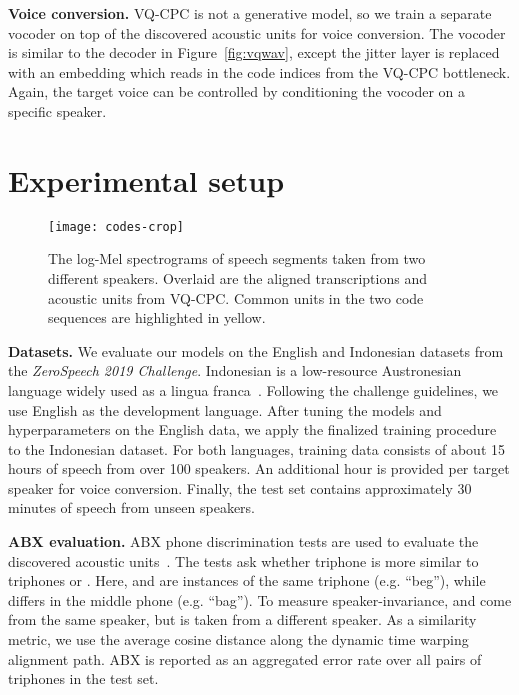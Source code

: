 \documentclass[a4paper]{article}
\newcommand{\imagesep}{\vspace*{-4pt}}
\begin{document}
\textbf{Voice conversion.}
VQ-CPC is not a generative model, so we train a separate vocoder on top of the discovered acoustic units for voice conversion.
The vocoder is similar to the decoder in Figure~\ref{fig:vqwav}, except the jitter layer is replaced with an embedding which reads in the code indices from the VQ-CPC bottleneck. Again, the target voice can be controlled by conditioning the vocoder on a specific speaker.


 \section{Experimental setup}
\label{sec:setup}

\begin{figure*}[t]
    \centering
    \texttt{[image: codes-crop]}
        \imagesep
    \caption{
    The log-Mel spectrograms of speech segments taken from two different speakers. Overlaid are the aligned transcriptions and acoustic units from VQ-CPC. Common units in the two code sequences are highlighted in yellow.
}
    \label{fig:codes}
\end{figure*}

\indent\textbf{Datasets.} 
We evaluate our models on the English and Indonesian datasets from the \textit{ZeroSpeech 2019 Challenge}.
Indonesian is a low-resource Austronesian language widely used as a lingua franca~\cite{sakti+etal_ococosda08,sakti+etal_tcast08}. 
Following the challenge guidelines, we use English as the development language. 
After tuning the models and hyperparameters on the English data, we apply the finalized training procedure to the Indonesian dataset.
For both languages, training data consists of about 15 hours of speech from over 100 speakers. 
An additional hour is provided per target speaker for voice conversion.
Finally, the test set contains approximately 30 minutes of speech from unseen speakers.

\textbf{ABX evaluation.} 
ABX phone discrimination tests are used to evaluate the discovered acoustic units~\cite{schatz+etal_interspeech13}.
The tests ask whether triphone  is more similar to triphones  or .
Here,  and  are instances of the same triphone (e.g. ``beg''), while  differs in the middle phone (e.g. ``bag'').
To measure speaker-invariance,  and  come from the same speaker, but  is taken from a different speaker.
As a similarity metric, we use the average cosine distance along the dynamic time warping alignment path.
ABX is reported as an aggregated error rate over all pairs of triphones in the test set.
\end{document}
